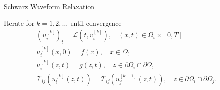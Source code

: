 \documentclass[]{beamer}
\begin{document}
\begin{frame}
{\begin{figure}
    \end{figure}
  }
\end{frame}


\begin{frame}{Schwarz Waveform Relaxation}

  Iterate for $k=1,2,\ldots$ until convergence
  \begin{eqnarray}
    \nonumber
    (u_i^{[k]})_t =  \mathcal{L}(t,u_i^{[k]}), \quad (x,t)\in \Omega_i\times[0,T]\\
    \nonumber
    u_i^{[k]}(x,0) = f(x), \quad x \in \Omega_i \\
    \nonumber
    u_i^{[k]}(z,t) = g(z,t), \quad z \in \partial\Omega_i\cap\partial\Omega, \\
    \nonumber
    \mathcal{T}_{ij}(u_{i}^{[k]}(z,t)) = \mathcal{T}_{ij}(u_{j}^{[k-1]}(z,t)), \quad z \in \partial\Omega_i\cap\partial\Omega_j.
  \end{eqnarray}

\end{frame}
\end{document}
